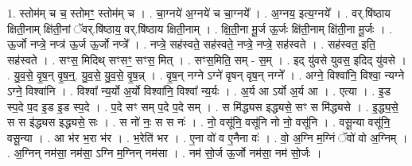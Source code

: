 \documentclass[17pt]{extarticle}
\begin{document}
1. स्तोम॑म् च च॒ स्तोमꣳ॒॒ स्तोम॑म् च । . चा॒ग्नये॑ अ॒ग्नये॑ च चा॒ग्नये᳚ । . अ॒ग्नय॒ इत्य॒ग्नये᳚ । . वर्.षि॑ष्ठाय क्षिती॒नाम् क्षि॑ती॒नां ॅवर्.षि॑ष्ठाय॒ वर्.षि॑ष्ठाय क्षिती॒नाम् । . क्षि॒ती॒ना मू॒र्ज ऊ॒र्जः क्षि॑ती॒नाम् क्षि॑ती॒ना मू॒र्जः । . ऊ॒र्जो नप्त्रे॒ नप्त्र॑ ऊ॒र्ज ऊ॒र्जो नप्त्रे᳚ । . नप्त्रे॒ सह॑स्वते॒ सह॑स्वते॒ नप्त्रे॒ नप्त्रे॒ सह॑स्वते । . सह॑स्वत॒ इति॒ सह॑स्वते । . सꣳस॒ मिदिथ् सꣳसꣳ॒॒ सꣳस॒ मित् । . सꣳस॒मिति॒ सम् - स॒म् । . इद् यु॑वसे युवस॒ इदिद् यु॑वसे । . यु॒व॒से॒ वृ॒ष॒न् वृ॒ष॒न्॒. यु॒व॒से॒ यु॒व॒से॒ वृ॒ष॒न्न् । . वृ॒ष॒न् नग्ने ऽग्ने॑ वृषन् वृष॒न् नग्ने᳚ । . अग्ने॒ विश्वा॑नि॒ विश्वा॒ न्यग्ने ऽग्ने॒ विश्वा॑नि । . विश्वा᳚ न्य॒र्यो अ॒र्यो विश्वा॑नि॒ विश्वा᳚ न्य॒र्यः । . अ॒र्य आ ऽर्यो अ॒र्य आ । . एत्या । . इ॒ड स्प॒दे प॒द इ॒ड इ॒ड स्प॒दे । . प॒दे सꣳ सम् प॒दे प॒दे सम् । . स मि॑द्ध्यस इद्ध्यसे॒ सꣳ स मि॑द्ध्यसे । . इ॒द्ध्य॒से॒ स स इ॑द्ध्यस इद्ध्यसे॒ सः । . स नो॑ नः॒ स स नः॑ । . नो॒ वसू॑नि॒ वसू॑नि नो नो॒ वसू॑नि । . वसू॒न्या वसू॑नि॒ वसू॒न्या । . आ भ॑र भ॒रा भ॑र । . भ॒रेति॑ भर । . ए॒ना वो॑ व ए॒नैना वः॑ । . वो॒ अ॒ग्नि म॒ग्निं ॅवो॑ वो अ॒ग्निम् । . अ॒ग्निन् नम॑सा॒ नम॑सा॒ ऽग्नि म॒ग्निन् नम॑सा । . नम॑ सो॒र्ज ऊ॒र्जो नम॑सा॒ नम॑ सो॒र्जः । \newline
\end{document}
